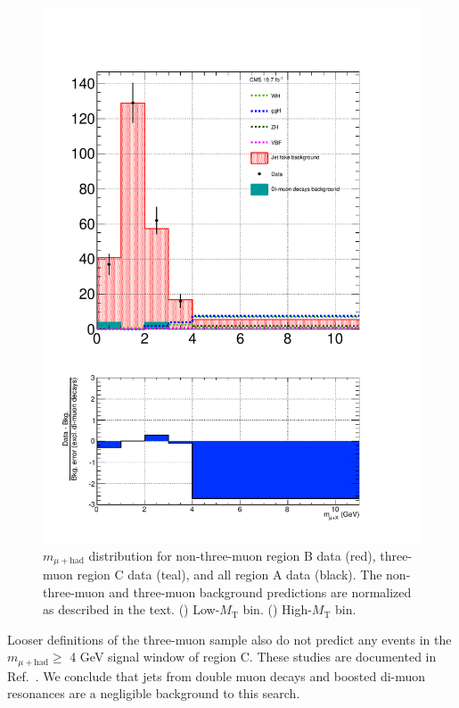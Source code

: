 \begin{figure}[hbtp]
\begin{center}
    \includegraphics[width=\cmsFigWidth]{figures/final_highMT_linear_v93}
    \caption{$m_{\mu+\text{had}}$ distribution for non-three-muon region B data (red), three-muon region C data (teal), and all region A data (black).  The non-three-muon and three-muon background predictions are normalized as described in the text.  (\cmsLeft) Low-$M_{\text{T}}$ bin. (\cmsRight) High-$M_{\text{T}}$ bin.}
    \label{fig:final-3mu}
  \end{center}
\end{figure}

Looser definitions of the three-muon sample also do not predict any events in the $m_{\mu+\text{had}} \geq$ 4 GeV signal window of region C.  These studies are documented in Ref.~\cite{HIG14022QA}.  We conclude that jets from double muon decays and boosted di-muon resonances are a negligible background to this search.

